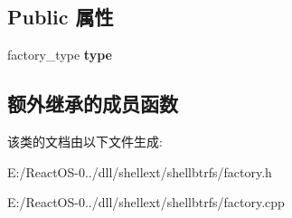 \subsection*{Public 属性}
\begin{DoxyCompactItemize}
\item 
\mbox{\label{class_factory_a1fed947c2dad84ae398c4e82ceba667f}} 
factory\+\_\+type {\bfseries type}
\end{DoxyCompactItemize}
\subsection*{额外继承的成员函数}


该类的文档由以下文件生成\+:\begin{DoxyCompactItemize}
\item 
E\+:/\+React\+O\+S-\/0../dll/shellext/shellbtrfs/factory.\+h\item 
E\+:/\+React\+O\+S-\/0../dll/shellext/shellbtrfs/factory.\+cpp\end{DoxyCompactItemize}
